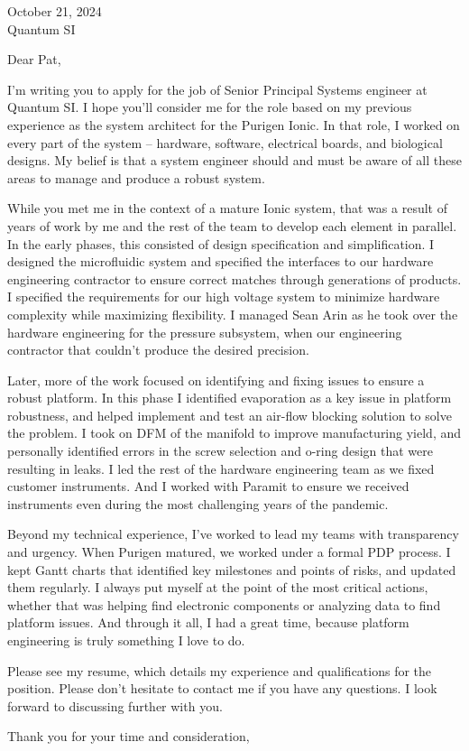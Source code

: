 \documentclass[a4paper, 10pt]{letter}
\begin{document}
\begin{letter}
{
    October 21, 2024\\
    Quantum SI\\
}

\opening{Dear Pat,}

I'm writing you to apply for the job of Senior Principal Systems engineer at Quantum SI. I hope you'll consider me for the role 
based on my previous experience as the system architect for the Purigen Ionic. In that role, I worked on every part of the system -- 
hardware, software, electrical boards, and biological designs. My belief
is that a system engineer should and must be aware of all these areas to manage and produce a robust system.

While you met me in the context of a mature Ionic system, that was a result of years of work by me and the rest of the team
to develop each element in parallel. In the early phases, this consisted 
of design specification and simplification. I designed the microfluidic system and specified the interfaces to our hardware engineering
contractor to ensure correct matches through generations of products. I specified the requirements for our high voltage system to 
minimize hardware complexity while maximizing flexibility. I managed Sean Arin as he took over the hardware engineering for the pressure
subsystem, when our engineering contractor that couldn't produce the desired precision. 

Later, more of the work focused on identifying and fixing issues to ensure
a robust platform. In this phase I identified evaporation as a key issue in platform robustness, and helped implement and test an air-flow blocking solution
to solve the problem. I took on DFM of the manifold to improve manufacturing yield, and personally identified errors in the screw selection 
and o-ring design that were resulting in leaks. I led the rest of the hardware engineering team as we fixed customer instruments. And I 
worked with Paramit to ensure we received instruments even during the most challenging years of the pandemic.

Beyond my technical experience, I've worked to lead my teams with transparency and urgency. When Purigen matured, we worked under a formal PDP process. 
I kept Gantt charts that identified key milestones and points of risks, and updated them regularly. I always put myself at the point of the most critical actions, 
whether that was helping find electronic components or analyzing data to find platform issues. And through it all, I had a great time, because platform engineering
is truly something I love to do. 

Please see my resume, which details my experience and qualifications for the position. Please don't hesitate to contact me if you have any questions. 
I look forward to discussing further with you. 

\closing{Thank you for your time and consideration,}

\end{letter}
\end{document}
